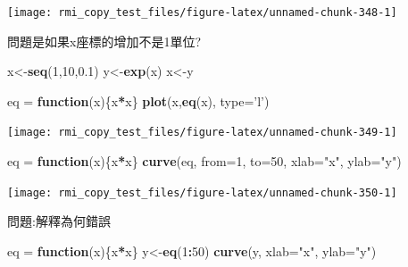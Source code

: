 \documentclass[]{book}
\newenvironment{Shaded}{\begin{snugshade}}{\end{snugshade}}
\newcommand{\ControlFlowTok}[1]{\textcolor[rgb]{0.13,0.29,0.53}{\textbf{#1}}}
\newcommand{\DataTypeTok}[1]{\textcolor[rgb]{0.13,0.29,0.53}{#1}}
\newcommand{\DecValTok}[1]{\textcolor[rgb]{0.00,0.00,0.81}{#1}}
\newcommand{\FloatTok}[1]{\textcolor[rgb]{0.00,0.00,0.81}{#1}}
\newcommand{\KeywordTok}[1]{\textcolor[rgb]{0.13,0.29,0.53}{\textbf{#1}}}
\newcommand{\NormalTok}[1]{#1}
\newcommand{\OperatorTok}[1]{\textcolor[rgb]{0.81,0.36,0.00}{\textbf{#1}}}
\newcommand{\StringTok}[1]{\textcolor[rgb]{0.31,0.60,0.02}{#1}}
\theoremstyle{definition}
\theoremstyle{definition}
\theoremstyle{definition}
\theoremstyle{remark}
\begin{document}
\begin{center}\texttt{[image: rmi\_copy\_test\_files/figure-latex/unnamed-chunk-348-1]} \end{center}

問題是如果x座標的增加不是1單位?

\begin{Shaded}
\begin{Highlighting}[]
\NormalTok{x<-}\KeywordTok{seq}\NormalTok{(}\DecValTok{1}\NormalTok{,}\DecValTok{10}\NormalTok{,}\FloatTok{0.1}\NormalTok{)}
\NormalTok{y<-}\KeywordTok{exp}\NormalTok{(x)}
\NormalTok{x<-y}

\NormalTok{eq =}\StringTok{ }\ControlFlowTok{function}\NormalTok{(x)\{x}\OperatorTok{*}\NormalTok{x\}}
\KeywordTok{plot}\NormalTok{(x,}\KeywordTok{eq}\NormalTok{(x), }\DataTypeTok{type=}\StringTok{'l'}\NormalTok{)}
\end{Highlighting}
\end{Shaded}

\begin{center}\texttt{[image: rmi\_copy\_test\_files/figure-latex/unnamed-chunk-349-1]} \end{center}

\begin{Shaded}
\begin{Highlighting}[]
\NormalTok{eq =}\StringTok{ }\ControlFlowTok{function}\NormalTok{(x)\{x}\OperatorTok{*}\NormalTok{x\}}
\KeywordTok{curve}\NormalTok{(eq, }\DataTypeTok{from=}\DecValTok{1}\NormalTok{, }\DataTypeTok{to=}\DecValTok{50}\NormalTok{, }\DataTypeTok{xlab=}\StringTok{"x"}\NormalTok{, }\DataTypeTok{ylab=}\StringTok{"y"}\NormalTok{)}
\end{Highlighting}
\end{Shaded}

\begin{center}\texttt{[image: rmi\_copy\_test\_files/figure-latex/unnamed-chunk-350-1]} \end{center}

問題:解釋為何錯誤

\begin{Shaded}
\begin{Highlighting}[]
\NormalTok{eq =}\StringTok{ }\ControlFlowTok{function}\NormalTok{(x)\{x}\OperatorTok{*}\NormalTok{x\}}
\NormalTok{y<-}\KeywordTok{eq}\NormalTok{(}\DecValTok{1}\OperatorTok{:}\DecValTok{50}\NormalTok{)}
\KeywordTok{curve}\NormalTok{(y, }\DataTypeTok{xlab=}\StringTok{"x"}\NormalTok{, }\DataTypeTok{ylab=}\StringTok{"y"}\NormalTok{)}
\end{Highlighting}
\end{Shaded}
\end{document}
